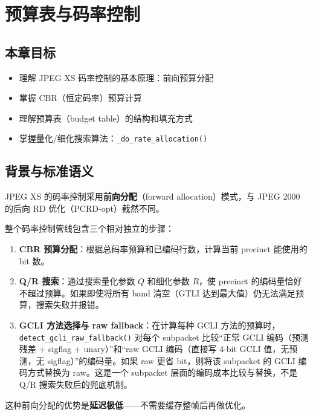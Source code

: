 
\chapter{预算表与码率控制}\label{ch:rate-control}

\section{本章目标}

\begin{itemize}
  \item 理解 JPEG XS 码率控制的基本原理：前向预算分配
  \item 掌握 CBR（恒定码率）预算计算
  \item 理解预算表（budget table）的结构和填充方式
  \item 掌握量化/细化搜索算法：\texttt{\_do\_rate\_allocation()}
\end{itemize}

\section{背景与标准语义}

JPEG XS 的码率控制采用\textbf{前向分配}（forward allocation）模式，与 JPEG 2000 的后向 RD 优化（PCRD-opt）截然不同。

整个码率控制管线包含三个相对独立的步骤：

\begin{enumerate}
  \item \textbf{CBR 预算分配}：根据总码率预算和已编码行数，计算当前 precinct 能使用的 bit 数。
  \item \textbf{Q/R 搜索}：通过搜索量化参数 $Q$ 和细化参数 $R$，使 precinct 的编码量恰好不超过预算。如果即使将所有 band 清空（GTLI 达到最大值）仍无法满足预算，搜索失败并报错。
  \item \textbf{GCLI 方法选择与 raw fallback}：在计算每种 GCLI 方法的预算时，\texttt{detect\_gcli\_raw\_fallback()} 对每个 subpacket 比较``正常 GCLI 编码（预测残差 + sigflag + unary）''和``raw GCLI 编码（直接写 4-bit GCLI 值，无预测，无 sigflag）''的编码量。如果 raw 更省 bit，则将该 subpacket 的 GCLI 编码方式替换为 raw。这是一个 subpacket 层面的编码成本比较与替换，不是 Q/R 搜索失败后的兜底机制。
\end{enumerate}

这种前向分配的优势是\textbf{延迟极低}——不需要缓存整帧后再做优化。

